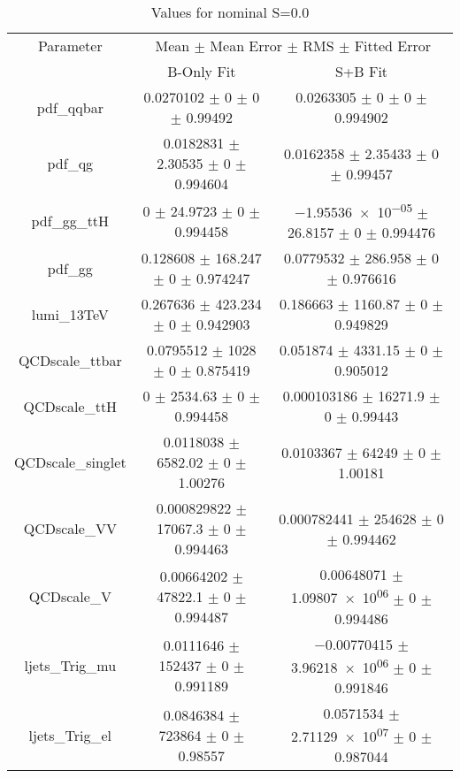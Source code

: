 \begin{table}
\centering
\caption{Values for nominal S=0.0}
\begin{tabular}{ccc}
\toprule
Parameter & \multicolumn{2}{c}{Mean $\pm$ Mean Error $\pm$ RMS $\pm$ Fitted Error}\\
 & B-Only Fit & S+B Fit\\
\midrule
pdf\_qqbar & \num{0.0270102} $\pm$ \num{0} $\pm$ \num{0} $\pm$ \num{0.99492} & \num{0.0263305} $\pm$ \num{0} $\pm$ \num{0} $\pm$ \num{0.994902}\\
pdf\_qg & \num{0.0182831} $\pm$ \num{2.30535} $\pm$ \num{0} $\pm$ \num{0.994604} & \num{0.0162358} $\pm$ \num{2.35433} $\pm$ \num{0} $\pm$ \num{0.99457}\\
pdf\_gg\_ttH & \num{0} $\pm$ \num{24.9723} $\pm$ \num{0} $\pm$ \num{0.994458} & \num{-1.95536e-05} $\pm$ \num{26.8157} $\pm$ \num{0} $\pm$ \num{0.994476}\\
pdf\_gg & \num{0.128608} $\pm$ \num{168.247} $\pm$ \num{0} $\pm$ \num{0.974247} & \num{0.0779532} $\pm$ \num{286.958} $\pm$ \num{0} $\pm$ \num{0.976616}\\
lumi\_13TeV & \num{0.267636} $\pm$ \num{423.234} $\pm$ \num{0} $\pm$ \num{0.942903} & \num{0.186663} $\pm$ \num{1160.87} $\pm$ \num{0} $\pm$ \num{0.949829}\\
QCDscale\_ttbar & \num{0.0795512} $\pm$ \num{1028} $\pm$ \num{0} $\pm$ \num{0.875419} & \num{0.051874} $\pm$ \num{4331.15} $\pm$ \num{0} $\pm$ \num{0.905012}\\
QCDscale\_ttH & \num{0} $\pm$ \num{2534.63} $\pm$ \num{0} $\pm$ \num{0.994458} & \num{0.000103186} $\pm$ \num{16271.9} $\pm$ \num{0} $\pm$ \num{0.99443}\\
QCDscale\_singlet & \num{0.0118038} $\pm$ \num{6582.02} $\pm$ \num{0} $\pm$ \num{1.00276} & \num{0.0103367} $\pm$ \num{64249} $\pm$ \num{0} $\pm$ \num{1.00181}\\
QCDscale\_VV & \num{0.000829822} $\pm$ \num{17067.3} $\pm$ \num{0} $\pm$ \num{0.994463} & \num{0.000782441} $\pm$ \num{254628} $\pm$ \num{0} $\pm$ \num{0.994462}\\
QCDscale\_V & \num{0.00664202} $\pm$ \num{47822.1} $\pm$ \num{0} $\pm$ \num{0.994487} & \num{0.00648071} $\pm$ \num{1.09807e+06} $\pm$ \num{0} $\pm$ \num{0.994486}\\
ljets\_Trig\_mu & \num{0.0111646} $\pm$ \num{152437} $\pm$ \num{0} $\pm$ \num{0.991189} & \num{-0.00770415} $\pm$ \num{3.96218e+06} $\pm$ \num{0} $\pm$ \num{0.991846}\\
ljets\_Trig\_el & \num{0.0846384} $\pm$ \num{723864} $\pm$ \num{0} $\pm$ \num{0.98557} & \num{0.0571534} $\pm$ \num{2.71129e+07} $\pm$ \num{0} $\pm$ \num{0.987044}\\

\end{tabular}
\end{table}
